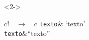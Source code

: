 \documentclass[handout,10pt]{beamer}
\begin{document}
\begin{frame}[fragile]
\begin{columns}
			\centering
					
	\end{columns}\vfill
	
	\begin{block}<2->{}
		\centering\Large
		\begin{tabular}{c!{$\quad\to\quad$}c}
			\crase\texttt{texto}\aspas             & `texto' \\
			\crase\crase\texttt{texto}\aspas\aspas &``texto''
		\end{tabular}
	\end{block}
	
			
\end{frame}
\end{document}
